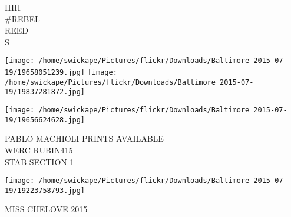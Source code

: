 \documentclass[10pt,letterpaper]{article}
\begin{document}
IIIII\\
\#REBEL\\
REED\\
S\\
\pagebreak

\texttt{[image: /home/swickape/Pictures/flickr/Downloads/Baltimore 2015-07-19/19658051239.jpg]}
\texttt{[image: /home/swickape/Pictures/flickr/Downloads/Baltimore 2015-07-19/19837281872.jpg]}

\vspace{0.25in}
\texttt{[image: /home/swickape/Pictures/flickr/Downloads/Baltimore 2015-07-19/19656624628.jpg]}

PABLO MACHIOLI PRINTS AVAILABLE\\
WERC RUBIN415\\
STAB SECTION 1\\
\pagebreak

\texttt{[image: /home/swickape/Pictures/flickr/Downloads/Baltimore 2015-07-19/19223758793.jpg]}

MISS CHELOVE 2015\\
\pagebreak
\end{document}
